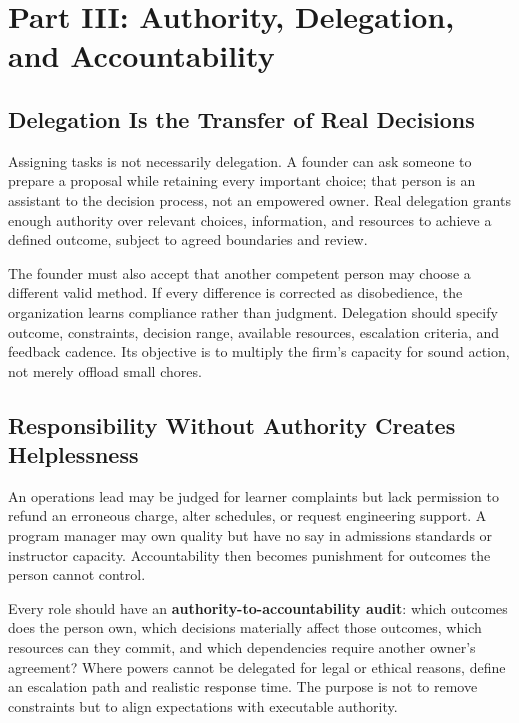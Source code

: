 \section*{Part III: Authority, Delegation, and Accountability}

\subsection{Delegation Is the Transfer of Real Decisions}
\label{sec:delegation_transfer_decisions}

Assigning tasks is not necessarily delegation. A founder can ask someone to prepare a proposal while retaining every important choice; that person is an assistant to the decision process, not an empowered owner. Real delegation grants enough authority over relevant choices, information, and resources to achieve a defined outcome, subject to agreed boundaries and review.

The founder must also accept that another competent person may choose a different valid method. If every difference is corrected as disobedience, the organization learns compliance rather than judgment. Delegation should specify outcome, constraints, decision range, available resources, escalation criteria, and feedback cadence. Its objective is to multiply the firm's capacity for sound action, not merely offload small chores.

\subsection{Responsibility Without Authority Creates Helplessness}
\label{sec:responsibility_without_authority}

An operations lead may be judged for learner complaints but lack permission to refund an erroneous charge, alter schedules, or request engineering support. A program manager may own quality but have no say in admissions standards or instructor capacity. Accountability then becomes punishment for outcomes the person cannot control.

Every role should have an \textbf{authority-to-accountability audit}: which outcomes does the person own, which decisions materially affect those outcomes, which resources can they commit, and which dependencies require another owner's agreement? Where powers cannot be delegated for legal or ethical reasons, define an escalation path and realistic response time. The purpose is not to remove constraints but to align expectations with executable authority.

